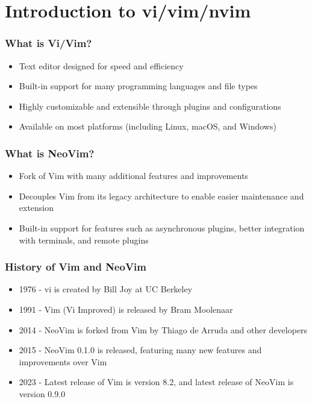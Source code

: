 \documentclass[9pt,table,xcolor=dvipsnames]{beamer}%
\theoremstyle{definition}
\theoremstyle{plain}
\begin{document}
\section{Introduction to vi/vim/nvim}
\begin{frame}
  \frametitle{What is Vi/Vim?}
  \begin{itemize}
    \item Text editor designed for speed and efficiency
    \item Built-in support for many programming languages and file types
    \item Highly customizable and extensible through plugins and configurations
    \item Available on most platforms (including Linux, macOS, and Windows)
  \end{itemize}
\end{frame}
\begin{frame}
  \frametitle{What is NeoVim?}
  \begin{itemize}
    \item Fork of Vim with many additional features and improvements
    \item Decouples Vim from its legacy architecture to enable easier maintenance and extension
    \item Built-in support for features such as asynchronous plugins, better integration with terminals, and remote plugins
  \end{itemize}
\end{frame}
\begin{frame}
  \frametitle{History of Vim and NeoVim}
  \begin{itemize}
    \item 1976 - vi is created by Bill Joy at UC Berkeley
    \item 1991 - Vim (Vi Improved) is released by Bram Moolenaar
    \item 2014 - NeoVim is forked from Vim by Thiago de Arruda and other developers
    \item 2015 - NeoVim 0.1.0 is released, featuring many new features and improvements over Vim
    \item 2023 - Latest release of Vim is version 8.2, and latest release of NeoVim is version 0.9.0
  \end{itemize}
\end{frame}
\end{document}
